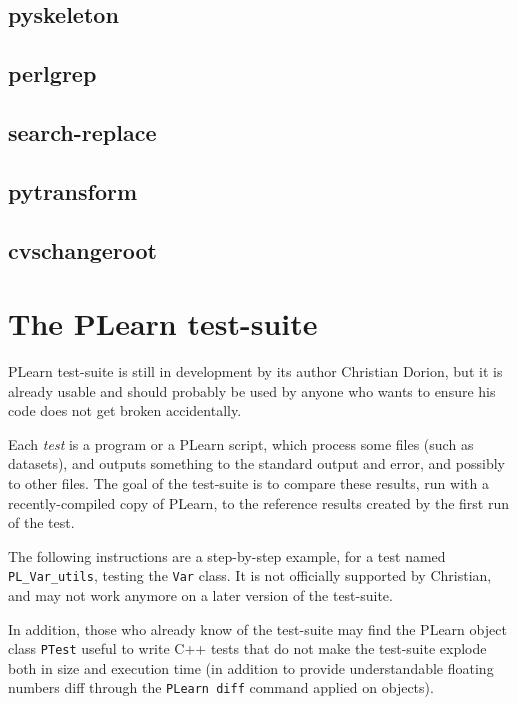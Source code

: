 \documentclass[11pt]{book}
\begin{document}
\section{pyskeleton}

\section{perlgrep}

\section{search-replace}

\section{pytransform}

\section{cvschangeroot}


\chapter{The PLearn test-suite }


PLearn test-suite is still in development by its author Christian
Dorion, but it is already usable and should probably be used by anyone
who wants to ensure his code does not get broken accidentally.

Each {\em test} is a program or a PLearn script, which process some
files (such as datasets), and outputs something to the standard output
and error, and possibly to other files. The goal of the test-suite is to
compare these results, run with a recently-compiled copy of PLearn, to
the reference results created by the first run of the test.

The following instructions are a step-by-step example, for a test named
{\tt PL\_Var\_utils}, testing the {\tt Var} class. It is not officially
supported by Christian, and may not work anymore on a later version of
the test-suite.

In addition, those who already know of the test-suite may find the
PLearn object class {\tt PTest} useful to write C++ tests that do not
make the test-suite explode both in size and execution time (in addition
to provide understandable floating numbers diff through the {\tt PLearn
diff} command applied on objects).
\end{document}
